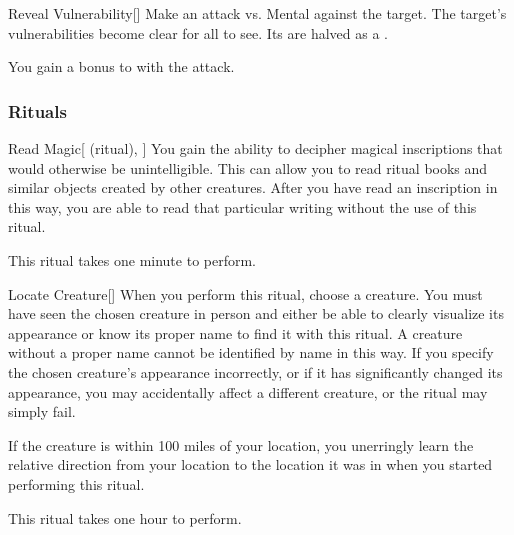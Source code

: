 \lowercase{\hypertarget{spell:Reveal Vulnerability}{}}\label{spell:Reveal Vulnerability}
\begin{freeability}[Rank 6]{\hypertarget{spell:Reveal Vulnerability}{Reveal Vulnerability}}[]
Make an attack vs. Mental against the target.
\hit The target's vulnerabilities become clear for all to see.
Its  are halved as a .

\rankline
{} You gain a  bonus to  with the attack.
\end{freeability}
\vspace{0.25em}



\subsubsection{Rituals}


\lowercase{\hypertarget{spell:Read Magic}{}}\label{spell:Read Magic}
\begin{attuneability}[Rank 1]{\hypertarget{spell:Read Magic}{Read Magic}}[ (ritual), ]
You gain the ability to decipher magical inscriptions that would otherwise be unintelligible.
This can allow you to read ritual books and similar objects created by other creatures.
After you have read an inscription in this way, you are able to read that particular writing without the use of this ritual.

This ritual takes one minute to perform.
\end{attuneability}
\vspace{0.25em}



\lowercase{\hypertarget{spell:Locate Creature}{}}\label{spell:Locate Creature}
\begin{freeability}[Rank 3]{\hypertarget{spell:Locate Creature}{Locate Creature}}[]
\targetrule
When you perform this ritual, choose a creature.
You must have seen the chosen creature in person and either be able to clearly visualize its appearance or know its proper name to find it with this ritual.
A creature without a proper name cannot be identified by name in this way.
If you specify the chosen creature's appearance incorrectly, or if it has significantly changed its appearance, you may accidentally affect a different creature, or the ritual may simply fail.

If the creature is within 100 miles of your location, you unerringly learn the relative direction from your location to the location it was in when you started performing this ritual.

This ritual takes one hour to perform.
\end{freeability}
\vspace{0.25em}



